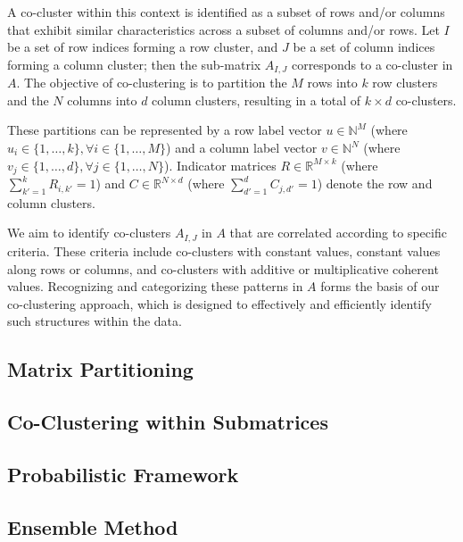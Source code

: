 A co-cluster within this context is identified as a subset of rows and/or columns that exhibit similar characteristics across a subset of columns and/or rows. Let $I$ be a set of row indices forming a row cluster, and $J$ be a set of column indices forming a column cluster; then the sub-matrix $A_{I,J}$ corresponds to a co-cluster in $A$. The objective of co-clustering is to partition the $M$ rows into $k$ row clusters and the $N$ columns into $d$ column clusters, resulting in a total of $k \times d$ co-clusters.

These partitions can be represented by a row label vector $u \in \mathbb{N}^M$ (where $u_i \in \{1, \ldots, k\}, \forall i \in \{1, \ldots, M\}$) and a column label vector $v \in \mathbb{N}^N$ (where $v_j \in \{1, \ldots, d\}, \forall j \in \{1, \ldots, N\}$). Indicator matrices $R \in \mathbb{R}^{M \times k}$ (where $\sum_{k'=1}^{k} R_{i,k'} = 1$) and $C \in \mathbb{R}^{N \times d}$ (where $\sum_{d'=1}^{d} C_{j,d'} = 1$) denote the row and column clusters. 

We aim to identify co-clusters $A_{I,J}$ in $A$ that are correlated according to specific criteria. These criteria include co-clusters with constant values, constant values along rows or columns, and co-clusters with additive or multiplicative coherent values. Recognizing and categorizing these patterns in $A$ forms the basis of our co-clustering approach, which is designed to effectively and efficiently identify such structures within the data.

\subsection{Matrix Partitioning}

\subsection{Co-Clustering within Submatrices}

\subsection{Probabilistic Framework}

\subsection{Ensemble Method}

